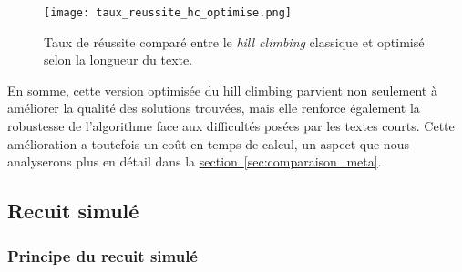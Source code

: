 \documentclass[a4paper]{article}
\begin{document}
\begin{figure}[H]
    \centering
    \texttt{[image: taux\_reussite\_hc\_optimise.png]}
    \caption{Taux de réussite comparé entre le \textit{hill climbing} classique et optimisé selon la longueur du texte.}
    \label{fig:taux_reussite_optimise}
\end{figure}

En somme, cette version optimisée du hill climbing parvient non seulement à améliorer la qualité des solutions trouvées, mais elle renforce également la robustesse de l’algorithme face aux difficultés posées par les textes courts. Cette amélioration a toutefois un coût en temps de calcul, un aspect que nous analyserons plus en détail dans la \hyperref[sec:comparaison_meta]{section~\ref*{sec:comparaison_meta}}.

\subsection{Recuit simulé}
\subsubsection{Principe du recuit simulé}
\end{document}
